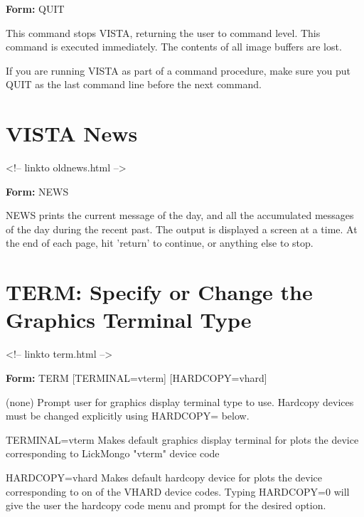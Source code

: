 \begin{command}
   \item[\textbf{Form: } QUIT\hfill]{}
\end{command}

This command stops VISTA, returning the user to command level.  This
command is executed immediately. The contents of all image buffers are
lost.

If you are running VISTA as part of a command procedure, make sure you put
QUIT as the last command line before the next command.

\section{VISTA News}
\begin{rawhtml}
<!-- linkto oldnews.html -->
\end{rawhtml}

\begin{command}
  \item[\textbf{Form: } NEWS\hfill]{}
\end{command}

NEWS prints the current message of the day, and all the accumulated
messages of the day during the recent past.  The output is displayed a
screen at a time.  At the end of each page, hit 'return' to continue, or
anything else to stop.

\section{TERM: Specify or Change the Graphics Terminal Type}
\begin{rawhtml}
<!-- linkto term.html -->
\end{rawhtml}

\begin{command}
   \item[\textbf{Form: } TERM {[TERMINAL=vterm]} {[HARDCOPY=vhard]}\hfill]{}

   \item[(none)]{Prompt user for graphics display terminal type to use.
        Hardcopy devices must be changed explicitly using HARDCOPY= below.}

   \item[TERMINAL=vterm]{Makes default graphics display terminal for plots
        the device corresponding to LickMongo "vterm" device code}

   \item[HARDCOPY=vhard]{Makes default hardcopy device for plots the device
        corresponding to on of the VHARD device codes.  Typing HARDCOPY=0
        will give the user the hardcopy code menu and prompt for the
        desired option.}
\end{command}

